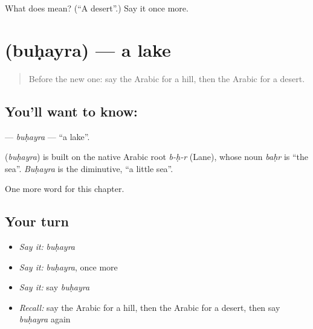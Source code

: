 \begin{tcolorbox}[breakable,colback=teal!4,colframe=teal!35!black,title={Before you move on}]
What does  mean? (\textquotedblleft{}A desert\textquotedblright{}.) Say it once more.
\end{tcolorbox}
\section[\texorpdfstring{\ar{بحيرة} (buḥayra)}{بحيرة (buḥayra)}]{ (buḥayra) — a lake}

\label{lesson:AR-C133-buhayra}



\begin{quote}
Before the new one: say the Arabic for a hill, then the Arabic for a desert.
\end{quote}

\subsection*{You'll want to know: }
\textbf{} — \emph{buḥayra} — \textquotedblleft{}a lake\textquotedblright{}.

\begin{cousinweb}
\textbf{} (\emph{buḥayra}) is built on the native Arabic root \emph{b-ḥ-r} (Lane), whose noun \emph{baḥr} is \textquotedblleft{}the sea\textquotedblright{}. \emph{Buḥayra} is the diminutive, \textquotedblleft{}a little sea\textquotedblright{}.
\end{cousinweb}

\begin{grammarlens}[title={What you've built}]
One more word for this chapter.
\end{grammarlens}

\subsection*{Your turn}
\begin{itemize}
\raggedright
  \item \emph{Say it:} \emph{buḥayra}
  \item \emph{Say it:} \emph{buḥayra}, once more
  \item \emph{Say it:} say \emph{buḥayra}
  \item \emph{Recall:} say the Arabic for a hill, then the Arabic for a desert, then say \emph{buḥayra} again
\end{itemize}

